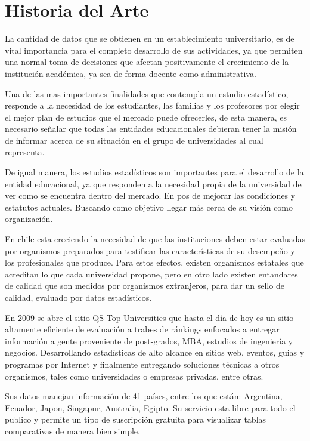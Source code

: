 \documentclass[a4paper,12pt,openany,oneside]{book}
\begin{document}
\section{Historia del Arte}
La cantidad de datos que se obtienen en un establecimiento universitario, es de vital importancia para el completo desarrollo de sus actividades, ya que permiten una normal toma de decisiones que afectan positivamente el crecimiento de la institución académica, ya sea de forma docente como administrativa. 

Una de las mas importantes finalidades que contempla un estudio estadístico, responde a la necesidad de los estudiantes, las familias y los profesores por elegir el mejor plan de estudios que el mercado puede ofrecerles, de esta manera, es necesario señalar que todas las entidades educacionales debieran tener la misión de informar acerca de su situación en el grupo de universidades al cual representa.

De igual manera, los estudios estadísticos son importantes para el desarrollo de la entidad educacional, ya que responden a la necesidad propia de la universidad de ver como se encuentra dentro del mercado. En pos de mejorar las condiciones y estatutos actuales. Buscando como objetivo llegar más cerca de su visión como organización.

En chile esta creciendo la necesidad de que las instituciones deben estar evaluadas por organismos preparados para testificar las características de su desempeño y los profesionales que produce. Para estos efectos, existen organismos estatales que acreditan lo que cada universidad propone, pero en otro lado existen entandares de calidad que son medidos por organismos extranjeros, para dar un sello de calidad, evaluado por datos estadísticos\cite{data1}.

En 2009 se abre el sitio QS Top Universities que hasta el día de hoy es un sitio altamente eficiente de evaluación a trabes de ránkings enfocados a entregar información a gente proveniente de post-grados, MBA, estudios de ingeniería y negocios. Desarrollando estadísticas de alto alcance en sitios web, eventos, guias y programas por Internet y finalmente entregando soluciones técnicas a otros organismos, tales como universidades o empresas privadas, entre otras.

Sus datos manejan información de 41 países, entre los que están: Argentina, Ecuador, Japon, Singapur, Australia, Egipto. Su servicio esta libre para todo el publico y permite un tipo de suscripción gratuita para visualizar tablas comparativas de manera bien simple.
\end{document}
